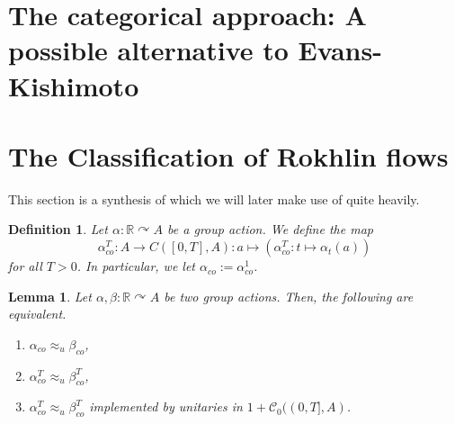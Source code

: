 \documentclass[11pt,a4paper,oneside]{amsart}
\newtheorem{lemma}[theorem]{Lemma}
\newtheorem{definition}[theorem]{Definition}
\newcommand{\acts}{\curvearrowright}
\begin{document}
\section{The categorical approach: A possible alternative to Evans-Kishimoto}


\section{The Classification of Rokhlin flows}


This section is a synthesis of \cite{szabo2021classification} which we will later make use of quite heavily.

\begin{definition}
Let $\alpha: \mathbb{R}\acts A$ be a group action. We define the map $$\alpha_{co}^T: A\rightarrow C([0,T], A): a\mapsto (\alpha_{co}^T: t\mapsto \alpha_t(a))$$
for all $T>0$. In particular, we let $\alpha_{co}:=\alpha_{co}^1$. 
\end{definition}


\begin{lemma}
Let $\alpha,\beta: \mathbb{R}\acts A$ be two group actions. Then, the following are equivalent.

\begin{enumerate}
\item $\alpha_{co}\approx_u \beta_{co}$, 
\item $\alpha^T_{co}\approx_u \beta_{co}^T$, 
\item $\alpha^T_{co}\approx_u \beta_{co}^T$ implemented by unitaries in $1+ \mathcal C_0((0,T], A)$. 
\end{enumerate}
\end{lemma}
\end{document}
